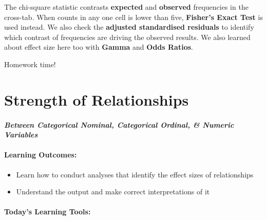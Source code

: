 \documentclass[
]{book}
\providecommand{\tightlist}{%
  \setlength{\itemsep}{0pt}\setlength{\parskip}{0pt}}
\begin{document}
The chi-square statistic contrasts \textbf{expected} and \textbf{observed} frequencies in the cross-tab. When counts in any one cell is lower than five, \textbf{Fisher's Exact Test} is used instead. We also check the \textbf{adjusted standardised residuals} to identify which contrast of frequencies are driving the observed results. We also learned about effect size here too with \textbf{Gamma} and \textbf{Odds Ratios}.

Homework time!

\hypertarget{strength-of-relationships}{%
\chapter{Strength of Relationships}\label{strength-of-relationships}}

\hypertarget{between-categorical-nominal-categorical-ordinal-numeric-variables}{%
\subsubsection*{\texorpdfstring{\emph{Between Categorical Nominal, Categorical Ordinal, \& Numeric Variables}}{Between Categorical Nominal, Categorical Ordinal, \& Numeric Variables}}\label{between-categorical-nominal-categorical-ordinal-numeric-variables}}

\hypertarget{learning-outcomes-7}{%
\subsubsection*{Learning Outcomes:}\label{learning-outcomes-7}}

\begin{itemize}
\tightlist
\item
  Learn how to conduct analyses that identify the effect sizes of relationships
\item
  Understand the output and make correct interpretations of it
\end{itemize}

\hypertarget{todays-learning-tools-7}{%
\subsubsection*{Today's Learning Tools:}\label{todays-learning-tools-7}}
\end{document}
